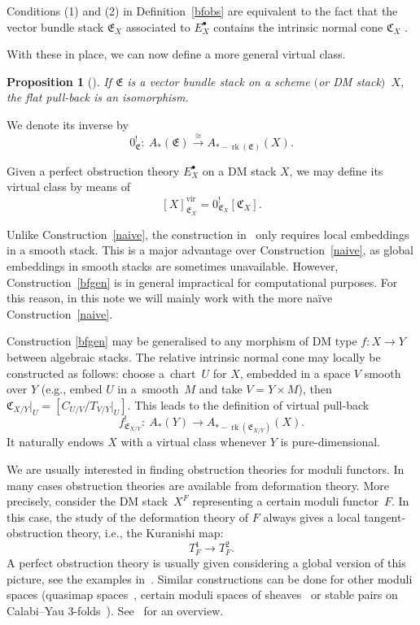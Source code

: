 \documentclass[pdftex]{sigma}
\numberwithin{equation}{section}
\newtheorem{Proposition}[Theorem]{Proposition}
 { \theoremstyle{definition}
\newtheorem{Definition}[Theorem]{Definition}
\newtheorem{Note}[Theorem]{Note}
\newtheorem{Example}[Theorem]{Example}
\newtheorem{Remark}[Theorem]{Remark}
\newtheorem{notation}[Theorem]{Notation}
\newtheorem{construction}[Theorem]{Construction}
}
\newcommand{\vv}{\mathrm{vir}}
\newcommand{\E}{\mathfrak E}
\newcommand{\rk}{\operatorname{rk}}
\theoremstyle{plain}
\theoremstyle{definition}
\theoremstyle{remark}
\begin{document}
Conditions (1) and (2) in Definition~\ref{bfobs} are equivalent to the fact that the vector bundle stack $\mathfrak{E}_X$ associated to $E^{\bullet}_{X}$ contains the intrinsic normal cone $\mathfrak C_X$ \cite[Theorem~4.5]{BerFan}.

With these in place, we can now define a more general virtual class.
 \begin{Proposition}[\cite{Kstacks}] If $\E$ is a vector bundle stack on a scheme $($or DM stack$)$~$X$, the flat pull-back is an isomorphism.
\end{Proposition}
We denote its inverse by
\[0^!_{\E}\colon \ A_*(\E)\xrightarrow{\cong} A_{*-\rk(\mathfrak{E})}(X).\]

\begin{construction} \label{bfgen} Given a perfect obstruction theory $E^\bullet_X$ on a DM stack $X$, we may define its virtual class by means of
\[[X]^{\vv}_{\E_{X}}=0^!_{\E_{X}}[\mathfrak C_X].\]
\end{construction}
\begin{Remark} Unlike Construction~\ref{naive}, the construction in~\cite{BerFan} only requires local embeddings in a smooth stack. This is a major advantage over Construction~\ref{naive}, as global embeddings in smooth stacks are sometimes unavailable. However, Construction~\ref{bfgen} is in general impractical for computational purposes. For this reason, in this note we will mainly work with the more na\"ive Construction~\ref{naive}.
\end{Remark}
\begin{Remark}
 Construction \ref{bfgen} may be generalised to any morphism of DM type $f\colon X\to Y$ between algebraic stacks. The relative intrinsic normal cone may locally be constructed as follows: choose a~chart~$U$ for $X$, embedded in a space $V$ smooth over $Y$ (e.g., embed $U$ in a~smooth~$M$ and take $V=Y\times M$), then $\mathfrak C_{X/Y}|_U=[C_{U/V}/T_{V/Y}|_U]$. This leads to the definition of virtual pull-back~\cite{vir-pull}
 \[f^!_{\E_{X/Y}}\colon \ A_*(Y)\to A_{*-\rk(\E_{X/Y})}(X).\]
 It naturally endows $X$ with a virtual class whenever $Y$ is pure-dimensional.
\end{Remark}

\begin{Remark} We are usually interested in finding obstruction theories for moduli functors. In many cases obstruction theories are available from deformation theory. More precisely, consider the DM stack~$X^F$ representing a certain moduli functor~$F$. In this case, the study of the deformation theory of $F$ always gives a local tangent-obstruction theory, i.e., the Kuranishi map:
\[T^1_F\to T^2_F.\]
A perfect obstruction theory is usually given considering a global version of this picture, see the examples in~\cite{Ber}. Similar constructions can be done for other moduli spaces (quasimap spaces~\cite{CF-K-M}, certain moduli spaces of sheaves~\cite{thomas} or stable pairs on Calabi--Yau 3-folds~\cite{pan-thomas}). See~\cite{rt} for an overview.
\end{Remark}
\end{document}
